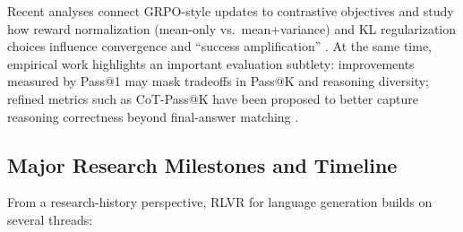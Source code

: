 \documentclass[sigconf]{acmart}
\begin{document}
Recent analyses connect GRPO-style updates to contrastive objectives and study how reward normalization (mean-only vs.\ mean+variance) and KL regularization choices influence convergence and ``success amplification'' \cite{mroueh2025grpo}.
At the same time, empirical work highlights an important evaluation subtlety: improvements measured by Pass@1 may mask tradeoffs in Pass@K and reasoning diversity; refined metrics such as CoT-Pass@K have been proposed to better capture reasoning correctness beyond final-answer matching \cite{wen2025rlvr}.

\subsection{Major Research Milestones and Timeline}

From a research-history perspective, RLVR for language generation builds on several threads:
\end{document}
